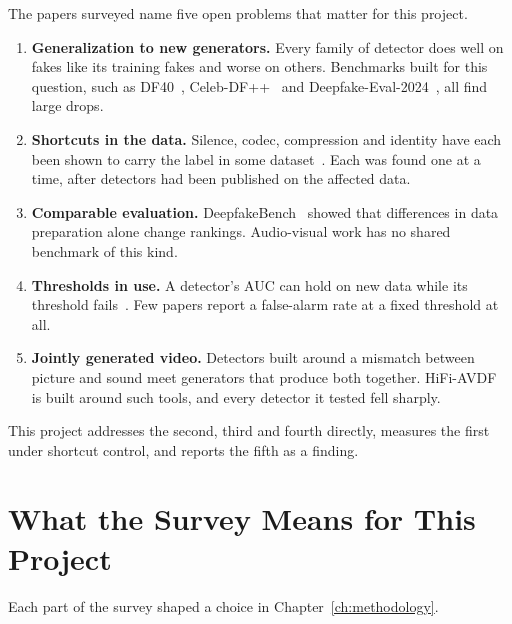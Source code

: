 The papers surveyed name five open problems that matter for this project.

\begin{enumerate}
    \item \textbf{Generalization to new generators.} Every family of detector
    does well on fakes like its training fakes and worse on others. Benchmarks
    built for this question, such as DF40~\cite{df40},
    Celeb-DF++~\cite{celebdfpp} and Deepfake-Eval-2024~\cite{dfeval2024}, all
    find large drops.
    \item \textbf{Shortcuts in the data.} Silence, codec, compression and
    identity have each been shown to carry the label in some
    dataset~\cite{mueller2021,smeu2025,grommelt2024,dong2023}. Each was found
    one at a time, after detectors had been published on the affected data.
    \item \textbf{Comparable evaluation.} DeepfakeBench~\cite{deepfakebench}
    showed that differences in data preparation alone change rankings.
    Audio-visual work has no shared benchmark of this kind.
    \item \textbf{Thresholds in use.} A detector's AUC can hold on new data
    while its threshold fails~\cite{nguyen2026,laionmobile2026}. Few papers
    report a false-alarm rate at a fixed threshold at all.
    \item \textbf{Jointly generated video.} Detectors built around a mismatch
    between picture and sound meet generators that produce both together.
    HiFi-AVDF~\cite{havic} is built around such tools, and every detector it
tested fell sharply.
\end{enumerate}

This project addresses the second, third and fourth directly, measures the
first under shortcut control, and reports the fifth as a finding.

\section{What the Survey Means for This Project}

Each part of the survey shaped a choice in Chapter~\ref{ch:methodology}.


